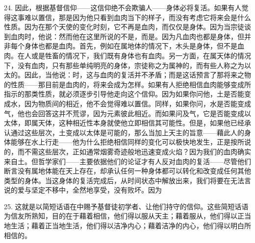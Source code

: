 24. 因此，根据基督信仰——这信仰绝不会欺骗人——身体必将复活。如果有人觉得这事难以置信，那是因为他只看到血肉当下的样子，而没有考虑它将来会是什么性质。因为在那个天使的变化时刻，它不再是血肉，而仅仅是身体。因为当宗徒谈到血肉时，他说：然而他在这里所说的不是，而是。因为凡血肉也都是身体，但并非每个身体也都是血肉。首先，例如在属地体的情况下，木头是身体，但不是血肉。在人或是牲畜的情况下，我们既有身体也有血肉。另一方面，在属天体的情况下，没有血肉，只有那些单纯明亮的身体，宗徒称之为属神的，而有些人称之为以太的。因此，当他说：时，这与血肉的复活并不矛盾；而是这话预言了那将来之物的性质——那目前是血肉的，将来会成为怎样。如果有人拒绝相信血肉能够变成所指示的那类性质，就必须逐步引导他走向这个信仰。因为如果你问他，土是否能变成水，因为物质间的相近，他不会觉得难以置信。同样，如果你问，水是否能变成气，他也会回答这并不荒谬，因为元素彼此相近。而如果问及气，它是否能变成以太体，即属天体，这种相近性本身就使他立即相信其可能性。但是，如果他已经承认通过这些层次，土变成以太体是可能的，那么当加上天主的旨意——藉此人的身体能够在水上行走——他为什么拒绝相信同样的变化可以极快地发生，正是按所说的，而不需这些层次，正如通常烟雾奇迹般地迅速变成火焰？因为我们的血肉确实来自土。但哲学家们——主要依据他们的论证才有人反对血肉的复活——尽管他们断言没有属地体能在天上存在，却承认任何一种身体都可以转化和改变成任何其他类型的身体。当这身体的复活完成后，从时间状态中解放出来，我们将要在无法言说的爱与坚定不移中，全然地享受，没有败坏。因为\par

25. 这就是以简短话语在中赐予基督徒初学者、让他们持守的信仰。这些简短话语为信友所熟知，目的在于藉着相信，他们得以服从天主；藉着服从，他们得以正当地生活；藉着正当地生活，他们得以洁净内心；藉着洁净的内心，他们得以明白所相信的。\par


